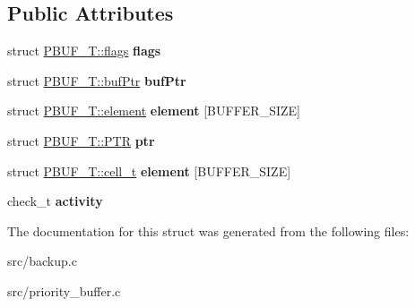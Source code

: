 \subsection*{Public Attributes}
\begin{DoxyCompactItemize}
\item 
\mbox{\label{structPBUF__T_aef3f97b88f8a21145beaa76799cfcb4b}} 
struct \hyperlink{structPBUF__T_1_1flags}{P\+B\+U\+F\+\_\+\+T\+::flags} {\bfseries flags}
\item 
\mbox{\label{structPBUF__T_a3b18661739955d1f5e43ef61bd149a4d}} 
struct \hyperlink{structPBUF__T_1_1bufPtr}{P\+B\+U\+F\+\_\+\+T\+::buf\+Ptr} {\bfseries buf\+Ptr}
\item 
\mbox{\label{structPBUF__T_a2b7b4a5242debfa93e5da8e3e7c9ad4b}} 
struct \hyperlink{structPBUF__T_1_1element}{P\+B\+U\+F\+\_\+\+T\+::element} {\bfseries element} \mbox{[}B\+U\+F\+F\+E\+R\+\_\+\+S\+I\+ZE\mbox{]}
\item 
\mbox{\label{structPBUF__T_a66bab8f3abac9b03f494a30ec65deea7}} 
struct \hyperlink{structPBUF__T_1_1PTR}{P\+B\+U\+F\+\_\+\+T\+::\+P\+TR} {\bfseries ptr}
\item 
\mbox{\label{structPBUF__T_abc3293776fceb6ddeb3db09a8ce2f2d7}} 
struct \hyperlink{structPBUF__T_1_1cell__t}{P\+B\+U\+F\+\_\+\+T\+::cell\+\_\+t} {\bfseries element} \mbox{[}B\+U\+F\+F\+E\+R\+\_\+\+S\+I\+ZE\mbox{]}
\item 
\mbox{\label{structPBUF__T_aac34deba1ae4ef415285d9e5a6ae27fa}} 
check\+\_\+t {\bfseries activity}
\end{DoxyCompactItemize}


The documentation for this struct was generated from the following files\+:\begin{DoxyCompactItemize}
\item 
src/backup.\+c\item 
src/priority\+\_\+buffer.\+c\end{DoxyCompactItemize}
